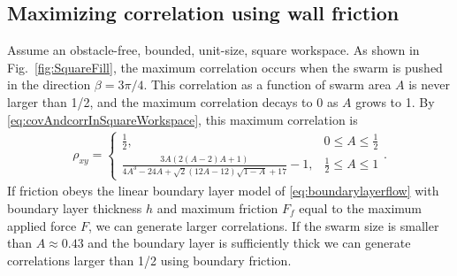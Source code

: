 \subsection{Maximizing correlation using wall friction}\label{subsec:ClosedLoopCovarianceControl}

Assume an obstacle-free, bounded, unit-size, square workspace. 
 As shown in Fig.~\ref{fig:SquareFill}, the maximum correlation occurs when the swarm is pushed in the direction $\beta = 3\pi/4$. 
 This correlation as a function of swarm area $A$ is never larger than 1/2, and the maximum correlation decays to 0 as $A$ grows to 1. By  \eqref{eq:covAndcorrInSquareWorkspace}, this maximum correlation is
\begin{align} \label{eq:GravityCorrelation}
\rho_{xy} =  \begin{cases}  \frac{1}{2}  , &  0\le A\le \frac{1}{2}  \\
 \frac{3 A (2 (A-2) A+1)}{4 A^3-24 A+\sqrt{2} (12 A-12) \sqrt{1-A}+17}-1
 , & \frac{1}{2} \le A\le 1
\end{cases}.
\end{align}
 If friction obeys the linear boundary layer model of \eqref{eq:boundarylayerflow} with boundary layer thickness $h$ and maximum friction $F_f$ equal to the maximum applied force $F$, we can generate  larger correlations.
 If the swarm size is smaller than $A \approx 0.43$ and the boundary layer is sufficiently thick we can generate correlations larger than 1/2  using boundary friction.

